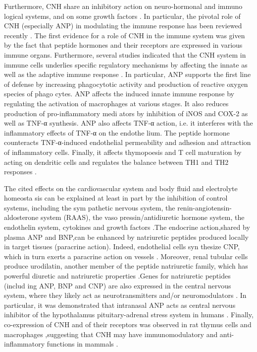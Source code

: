 \documentclass[14pt,a4paper,onecolumn]{extarticle}
\begin{document}
Furthermore, CNH share an inhibitory action on neuro-hormonal and immuno logical systems, and on some growth factors \citep{13}\citep{28}\citep{30}\citep{77}\citep{78}\citep{90-99}. In particular, the pivotal role of CNH (especially ANP) in modulating the immune response has been reviewed recently \citep{98}. The first evidence for a role of CNH in the immune system was given by the fact that peptide hormones and their receptors are expressed in various immune organs. Furthermore, several studies indicated that the CNH system in immune cells underlies specific regulatory mechanisms by affecting the innate as well as the adaptive immune response \citep{99}. In particular, ANP supports the first line of defense by increasing phagocytotic activity and production of reactive oxygen species of phago cytes. ANP affects the induced innate immune response by regulating the activation of macrophages at various stages. It also reduces production of pro-inflammatory medi ators by inhibition of iNOS and COX-2 as well as TNF-α synthesis. ANP also affects TNF-α action, i.e. it interferes with the inflammatory effects of TNF-α on the endothe lium. The peptide hormone counteracts TNF-α-induced endothelial permeability and adhesion and attraction of inflammatory cells. Finally, it affects thymopoesis and T cell maturation by acting on dendritic cells and regulates the balance between TH1 and TH2 responses \citep{99}.

The cited effects on the cardiovascular system and body fluid and electrolyte homeosta sis can be explained at least in part by the inhibition of control systems, including the sym pathetic nervous system, the renin-angiotensin-aldosterone system (RAAS), the vaso pressin/antidiuretic hormone system, the endothelin system, cytokines and growth factors \citep{90-99}.The endocrine action,shared by plasma ANP and BNP,can be enhanced by natriuretic peptides produced locally in target tissues (paracrine action). Indeed, endothelial cells syn thesize CNP, which in turn exerts a paracrine action on vessels \citep{57}\citep{84-88}. Moreover, renal tubular cells produce urodilatin, another member of the peptide natriuretic family, which has powerful diuretic and natriuretic properties \citep{100}.Genes for natriuretic peptides (includ ing ANP, BNP and CNP) are also expressed in the central nervous system, where they likely act as neurotransmitters and/or neuromodulators \citep{91-93}\citep{100-102}. In particular, it was demonstrated that intranasal ANP acts as central nervous inhibitor of the hypothalamus pituitary-adrenal stress system in humans \citep{103}. Finally, co-expression of CNH and of their receptors was observed in rat thymus cells and macrophages \citep{104}\citep{105},suggesting that CNH may have immunomodulatory and anti-inflammatory functions in mammals \citep{106}.
\end{document}
